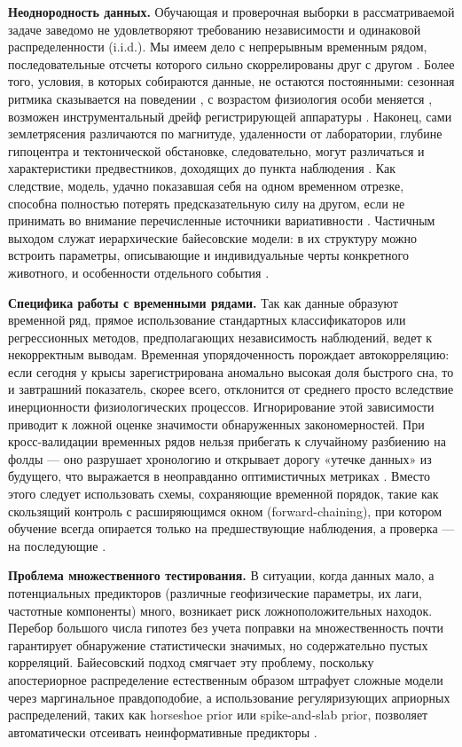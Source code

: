 \documentclass[14pt]{mmcs_article}
\begin{document}
\textbf{Неоднородность данных.} Обучающая и проверочная выборки в рассматриваемой задаче заведомо не удовлетворяют требованию независимости и одинаковой распределенности (i.i.d.). Мы имеем дело с непрерывным временным рядом, последовательные отсчеты которого сильно скоррелированы друг с другом \cite{Hyndman2018}. Более того, условия, в которых собираются данные, не остаются постоянными: сезонная ритмика сказывается на поведении \cite{Prendergast2002}, с возрастом физиология особи меняется \cite{Mendelson2000}, возможен инструментальный дрейф регистрирующей аппаратуры \cite{SunZheng2023}. Наконец, сами землетрясения различаются по магнитуде, удаленности от лаборатории, глубине гипоцентра и тектонической обстановке, следовательно, могут различаться и характеристики предвестников, доходящих до пункта наблюдения \cite{Cicerone2009}. Как следствие, модель, удачно показавшая себя на одном временном отрезке, способна полностью потерять предсказательную силу на другом, если не принимать во внимание перечисленные источники вариативности \cite{Sugiyama2012}. Частичным выходом служат иерархические байесовские модели: в их структуру можно встроить параметры, описывающие и индивидуальные черты конкретного животного, и особенности отдельного события \cite{Gelman2006}.

\textbf{Специфика работы с временными рядами.} Так как данные образуют временной ряд, прямое использование стандартных классификаторов или регрессионных методов, предполагающих независимость наблюдений, ведет к некорректным выводам. Временная упорядоченность порождает автокорреляцию: если сегодня у крысы зарегистрирована аномально высокая доля быстрого сна, то и завтрашний показатель, скорее всего, отклонится от среднего просто вследствие инерционности физиологических процессов. Игнорирование этой зависимости приводит к ложной оценке значимости обнаруженных закономерностей. При кросс-валидации временных рядов нельзя прибегать к случайному разбиению на фолды — оно разрушает хронологию и открывает дорогу «утечке данных» из будущего, что выражается в неоправданно оптимистичных метриках \cite{Bergmeir2012, ScikitLearnDevelopers}. Вместо этого следует использовать схемы, сохраняющие временной порядок, такие как скользящий контроль с расширяющимся окном (forward-chaining), при котором обучение всегда опирается только на предшествующие наблюдения, а проверка — на последующие \cite{RemNoteStudyDeck}.

\textbf{Проблема множественного тестирования.} В ситуации, когда данных мало, а потенциальных предикторов (различные геофизические параметры, их лаги, частотные компоненты) много, возникает риск ложноположительных находок. Перебор большого числа гипотез без учета поправки на множественность почти гарантирует обнаружение статистически значимых, но содержательно пустых корреляций. Байесовский подход смягчает эту проблему, поскольку апостериорное распределение естественным образом штрафует сложные модели через маргинальное правдоподобие, а использование регуляризующих априорных распределений, таких как horseshoe prior или spike-and-slab prior, позволяет автоматически отсеивать неинформативные предикторы \cite{Denti2021}.
\end{document}
